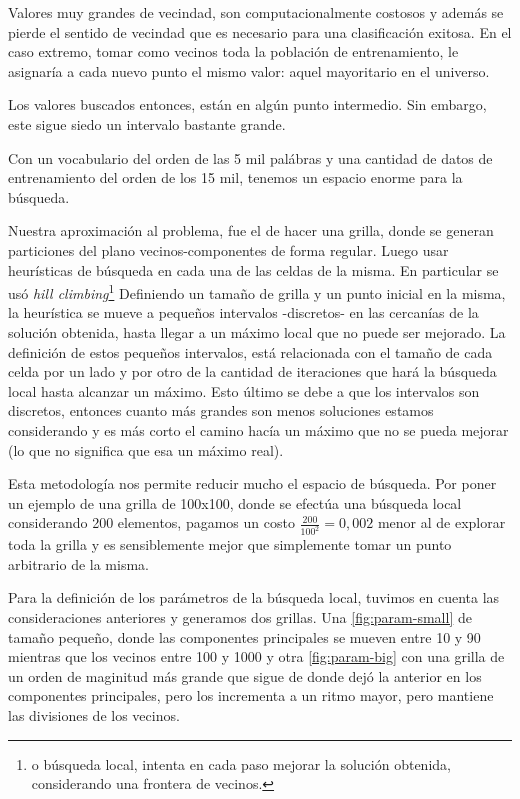 Valores muy grandes de vecindad, son computacionalmente costosos y
además se pierde el sentido de vecindad que es necesario para una
clasificación exitosa. En el caso extremo, tomar como vecinos toda la
población de entrenamiento, le asignaría a cada nuevo punto el mismo
valor: aquel mayoritario en el universo.

Los valores buscados entonces, están en algún punto intermedio. Sin
embargo, este sigue siedo un intervalo bastante grande.

Con un vocabulario del orden de las 5 mil palábras y una cantidad de
datos de entrenamiento del orden de los 15 mil, tenemos un espacio
enorme para la búsqueda.

Nuestra aproximación al problema, fue el de hacer una grilla, donde se
generan particiones del plano vecinos-componentes de forma
regular. Luego usar heurísticas de búsqueda en cada una de las celdas
de la misma. En particular se usó \emph{hill
  climbing}\cite{aiama}\footnote{o búsqueda local, intenta en cada paso
  mejorar la solución obtenida, considerando una frontera de vecinos.}
Definiendo un tamaño de grilla y un punto inicial en la misma, la
heurística se mueve a pequeños intervalos -discretos- en las cercanías
de la solución obtenida, hasta llegar a un máximo local que no puede
ser mejorado. La definición de estos pequeños intervalos, está
relacionada con el tamaño de cada celda por un lado y por otro de la
cantidad de iteraciones que hará la búsqueda local hasta alcanzar un
máximo. Esto último se debe a que los intervalos son discretos,
entonces cuanto más grandes son menos soluciones estamos considerando
y es más corto el camino hacía un máximo que no se pueda mejorar (lo
que no significa que esa un máximo real).

Esta metodología nos permite reducir mucho el espacio de búsqueda. Por
poner un ejemplo de una grilla de 100x100, donde se efectúa una
búsqueda local considerando 200 elementos, pagamos un costo
$\frac{200}{100^2} = 0,002$ menor al de explorar toda la grilla y es
sensiblemente mejor que simplemente tomar un punto arbitrario de la
misma.

Para la definición de los parámetros de la búsqueda local, tuvimos en
cuenta las consideraciones anteriores y generamos dos
grillas. Una \ref{fig:param-small} de tamaño pequeño, donde las
componentes principales se mueven entre 10 y 90 mientras que los
vecinos entre 100 y 1000 y otra \ref{fig:param-big} con una grilla de
un orden de maginitud más grande que sigue de donde dejó la anterior
en los componentes principales, pero los incrementa a un ritmo mayor,
pero mantiene las divisiones de los vecinos.

